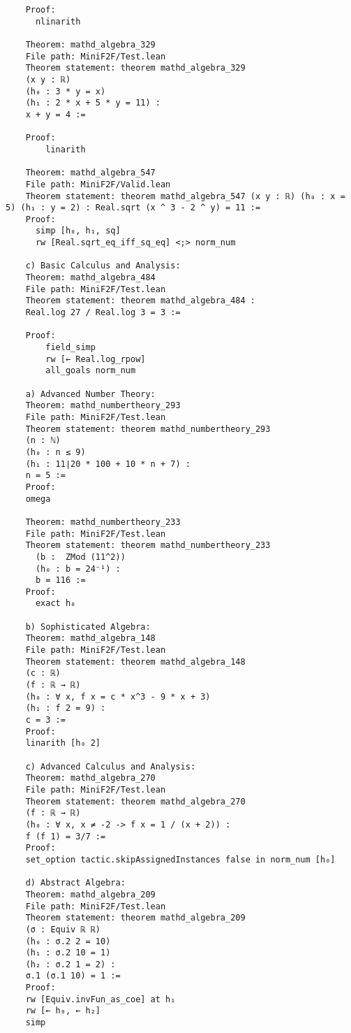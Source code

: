 \documentclass{article} %
\begin{document}
\begin{verbatim}
    Proof:
      nlinarith

    Theorem: mathd_algebra_329
    File path: MiniF2F/Test.lean
    Theorem statement: theorem mathd_algebra_329
    (x y : ℝ)
    (h₀ : 3 * y = x)
    (h₁ : 2 * x + 5 * y = 11) :
    x + y = 4 :=
    
    Proof:
        linarith

    Theorem: mathd_algebra_547
    File path: MiniF2F/Valid.lean
    Theorem statement: theorem mathd_algebra_547 (x y : ℝ) (h₀ : x = 5) (h₁ : y = 2) : Real.sqrt (x ^ 3 - 2 ^ y) = 11 :=
    Proof:
      simp [h₀, h₁, sq]
      rw [Real.sqrt_eq_iff_sq_eq] <;> norm_num

    c) Basic Calculus and Analysis:
    Theorem: mathd_algebra_484
    File path: MiniF2F/Test.lean
    Theorem statement: theorem mathd_algebra_484 :
    Real.log 27 / Real.log 3 = 3 :=
    
    Proof:
        field_simp
        rw [← Real.log_rpow]
        all_goals norm_num

    a) Advanced Number Theory:
    Theorem: mathd_numbertheory_293
    File path: MiniF2F/Test.lean
    Theorem statement: theorem mathd_numbertheory_293
    (n : ℕ)
    (h₀ : n ≤ 9)
    (h₁ : 11∣20 * 100 + 10 * n + 7) :
    n = 5 :=
    Proof:
    omega

    Theorem: mathd_numbertheory_233
    File path: MiniF2F/Test.lean
    Theorem statement: theorem mathd_numbertheory_233
      (b :  ZMod (11^2))
      (h₀ : b = 24⁻¹) :
      b = 116 :=
    Proof:
      exact h₀

    b) Sophisticated Algebra:
    Theorem: mathd_algebra_148
    File path: MiniF2F/Test.lean
    Theorem statement: theorem mathd_algebra_148
    (c : ℝ)
    (f : ℝ → ℝ)
    (h₀ : ∀ x, f x = c * x^3 - 9 * x + 3)
    (h₁ : f 2 = 9) :
    c = 3 :=
    Proof:
    linarith [h₀ 2]

    c) Advanced Calculus and Analysis:
    Theorem: mathd_algebra_270
    File path: MiniF2F/Test.lean
    Theorem statement: theorem mathd_algebra_270
    (f : ℝ → ℝ)
    (h₀ : ∀ x, x ≠ -2 -> f x = 1 / (x + 2)) :
    f (f 1) = 3/7 :=
    Proof:
    set_option tactic.skipAssignedInstances false in norm_num [h₀]

    d) Abstract Algebra:
    Theorem: mathd_algebra_209
    File path: MiniF2F/Test.lean
    Theorem statement: theorem mathd_algebra_209
    (σ : Equiv ℝ ℝ)
    (h₀ : σ.2 2 = 10)
    (h₁ : σ.2 10 = 1)
    (h₂ : σ.2 1 = 2) :
    σ.1 (σ.1 10) = 1 :=
    Proof:
    rw [Equiv.invFun_as_coe] at h₁
    rw [← h₀, ← h₂]
    simp

    
\end{verbatim}
\end{document}
